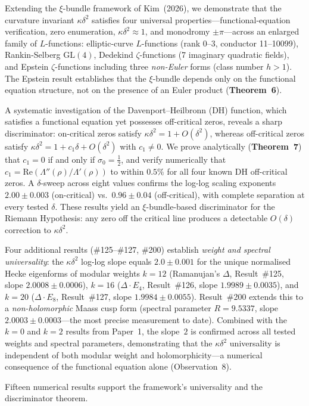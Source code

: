 \documentclass[11pt, a4paper]{article}
\theoremstyle{plain}
\theoremstyle{definition}
\begin{document}
\begin{tcolorbox}[
  colback=lightbg, colframe=zetaviolet!60!black,
  title={\bfseries Abstract}, fonttitle=\large,
  arc=3pt, boxrule=0.8pt, toptitle=3pt, bottomtitle=3pt
]
Extending the $\xi$-bundle framework of Kim~(2026), we demonstrate that
the curvature invariant $\kappa\delta^{2}$ satisfies four universal
properties---functional-equation verification, zero enumeration,
$\kappa\delta^{2}\approx 1$, and monodromy $\pm\pi$---across an enlarged
family of $L$-functions: elliptic-curve $L$-functions (rank 0--3,
conductor 11--10099), Rankin-Selberg $\mathrm{GL}(4)$, Dedekind
$\zeta$-functions (7 imaginary quadratic fields), and Epstein
$\zeta$-functions including three \emph{non-Euler} forms (class number
$h>1$).  The Epstein result establishes that the $\xi$-bundle depends
only on the functional equation structure, not on the presence of an
Euler product (\textbf{Theorem~6}).

A systematic investigation of the Davenport--Heilbronn (DH) function,
which satisfies a functional equation yet possesses off-critical zeros,
reveals a sharp discriminator: on-critical zeros satisfy $\kappa\delta^{2}
= 1 + O(\delta^{2})$, whereas off-critical zeros satisfy $\kappa\delta^{2}
= 1 + c_{1}\delta + O(\delta^{2})$ with $c_{1}\neq 0$.  We prove
analytically (\textbf{Theorem~7}) that $c_{1} = 0$ if and only if
$\sigma_{0}=\tfrac{1}{2}$, and verify numerically that
$c_{1} = \mathrm{Re}(\Lambda''(\rho)/\Lambda'(\rho))$ to within $0.5\%$
for all four known DH off-critical zeros.  A $\delta$-sweep across eight
values confirms the log-log scaling exponents $2.00\pm0.003$
(on-critical) vs.\ $0.96\pm0.04$ (off-critical), with complete
separation at every tested $\delta$.  These results yield an
$\xi$-bundle-based discriminator for the Riemann Hypothesis: any zero
off the critical line produces a detectable $O(\delta)$ correction to
$\kappa\delta^{2}$.

\smallskip
\noindent Four additional results (\#125--\#127, \#200) establish
\emph{weight and spectral universality}: the $\kappa\delta^{2}$ log-log slope equals
$2.0\pm 0.001$ for the unique normalised Hecke eigenforms of modular
weights $k=12$ (Ramanujan's $\Delta$, Result~\#125,
slope $2.0008\pm 0.0006$), $k=16$
($\Delta\cdot E_4$, Result~\#126, slope $1.9989\pm 0.0035$),
and $k=20$ ($\Delta\cdot E_8$, Result~\#127, slope $1.9984\pm 0.0055$).
Result~\#200 extends this to a \emph{non-holomorphic} Maass cusp form
(spectral parameter $R=9.5337$, slope $2.0003\pm 0.0003$---the most
precise measurement to date).  Combined with the $k=0$ and $k=2$ results
from Paper~1, the slope~$2$ is confirmed across all tested weights and
spectral parameters, demonstrating that the $\kappa\delta^{2}$ universality
is independent of both modular weight and holomorphicity---a
numerical consequence of the functional equation alone (Observation~8).

\smallskip
\noindent Fifteen numerical results support the framework's universality
and the discriminator theorem.
\end{tcolorbox}
\end{document}
